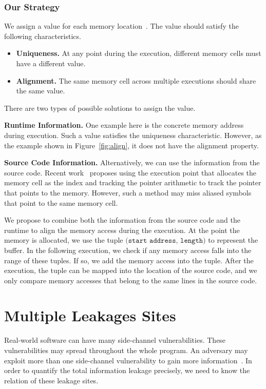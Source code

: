 \subsubsection*{Our Strategy} We assign a value for each memory location~\cite{sumner2010memory}. The value should satisfy the following characteristics.
\begin{itemize}
  \item \textbf{Uniqueness.} At any point during the execution, different memory cells must have a different value.
  \item \textbf{Alignment.} The same memory cell across multiple executions should share the same value.
\end{itemize}

There are two types of possible solutions to assign the value.

\textbf{Runtime Information.} One example here is the concrete memory address during execution. Such a value satisfies the uniqueness characteristic. However, as the example shown in Figure~\ref{fig:align}, it does not have the alignment property.

\textbf{Source Code Information.} Alternatively, we can use the information from the source code. Recent work~\cite{sumner2010memory} proposes using the execution point that allocates the memory cell as the index and tracking the pointer arithmetic to track the pointer that points to the memory. However, such a method may miss aliased symbols that point to the same memory cell.

We propose to combine both the information from the source code and the runtime to align the memory access during the execution. At the point the memory is allocated, we use the tuple $\texttt{(start\ address, length)}$ to represent the buffer. In the following execution, we check if any memory access falls into the range of these tuples. If so, we add the memory access into the tuple. After the execution, the tuple can be mapped into the location of the source code, and we only compare memory accesses that belong to the same lines in the source code.

\section{Multiple Leakages Sites}
Real-world software can have many side-channel vulnerabilities. These vulnerabilities may spread throughout the whole program. An adversary may exploit more than one side-channel vulnerability to gain more information~\cite{7163052, 191010}. In order to quantify the
total information leakage precisely, we need to know the relation of these leakage sites. 

